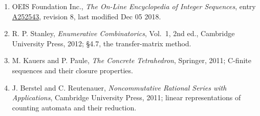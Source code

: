 \documentclass[11pt]{article}
\theoremstyle{definition}
\begin{document}
\begin{enumerate}

\item OEIS Foundation Inc., \emph{The On-Line Encyclopedia of Integer Sequences}, entry \href{https://oeis.org/A252543}{A252543}, revision 8, last modified Dec 05 2018.

\item R. P. Stanley, \emph{Enumerative Combinatorics}, Vol.~1, 2nd ed., Cambridge University Press, 2012; \S4.7, the transfer-matrix method.

\item M. Kauers and P. Paule, \emph{The Concrete Tetrahedron}, Springer, 2011; C-finite sequences and their closure properties.

\item J. Berstel and C. Reutenauer, \emph{Noncommutative Rational Series with Applications}, Cambridge University Press, 2011; linear representations of counting automata and their reduction.

\end{enumerate}
\end{document}
